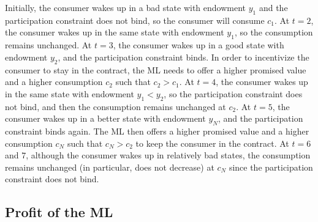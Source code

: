 \begin{center}
\end{center}


Initially, the consumer wakes up in a bad state with endowment $y_1$ and the participation constraint does not bind, so the consumer will consume $c_1$. At $t = 2$, the consumer wakes up in the same state with endowment $y_1$, so the consumption remains unchanged. At $t = 3$, the consumer wakes up in a good state with endowment $y_2$, and the participation constraint binds. In order to incentivize the consumer to stay in the contract, the ML needs to offer a higher promised value and a higher consumption $c_2$ such that $c_2>c_1$. At $t = 4$, the consumer wakes up in the same state with endowment $y_1<y_2$, so the participation constraint does not bind, and then the consumption remains unchanged at $c_2$. At $t = 5$, the consumer wakes up in a better state with endowment $y_N$, and the participation constraint binds again. The ML then offers a higher promised value and a higher consumption $c_N$ such that $c_N>c_2$ to keep the consumer in the contract. At $t = 6$ and $7$, although the consumer wakes up in relatively bad states, the consumption remains unchanged (in particular, does not decrease) at $c_N$ since the participation constraint does not bind.

\subsection{Profit of the ML}

